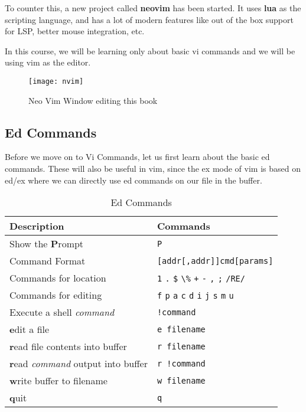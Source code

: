 To counter this, a new project called \textbf{neovim}
has been started.
It uses \textbf{lua} as the scripting language,
and has a lot of modern features like
out of the box support for LSP,
better mouse integration, etc.

In this course, we will be learning only
about basic vi commands and we will be
using vim as the editor.

\begin{figure}[h!]
  \texttt{[image: nvim]}
  \caption{Neo Vim Window editing this book}
\end{figure}


\vfill
\pagebreak

\subsection{Ed Commands}

Before we move on to Vi Commands,
let us first learn about the basic ed commands.
These will also be useful in vim, since the
ex mode of vim is based on ed/ex where we can
directly use ed commands on our file in the buffer.

\begin{table*}[h!]
  \caption{Ed Commands}
  \begin{tabular}{l l}
    \toprule
    Description & Commands \\
    \midrule
    Show the \textbf{P}rompt & \lstinline|P| \\
    Command Format & \lstinline|[addr[,addr]]cmd[params]| \\
    Commands for location & \lstinline|1| \lstinline|.| \lstinline|$| \lstinline|\%| \lstinline|+| \lstinline|-| \lstinline|,| \lstinline|;| \lstinline|/RE/| \\
    Commands for editing & \lstinline|f| \lstinline|p| \lstinline|a| \lstinline|c| \lstinline|d| \lstinline|i| \lstinline|j| \lstinline|s| \lstinline|m| \lstinline|u| \\
    Execute a shell \textit{command} & \lstinline|!command| \\
    \textbf{e}dit a file & \lstinline|e filename| \\
    \textbf{r}ead file contents into buffer & \lstinline|r filename| \\
    \textbf{r}ead \textit{command} output into buffer & \lstinline|r !command| \\
    \textbf{w}rite buffer to filename & \lstinline|w filename| \\
    \textbf{q}uit & \lstinline|q| \\
    \bottomrule
  \end{tabular}
\end{table*}


